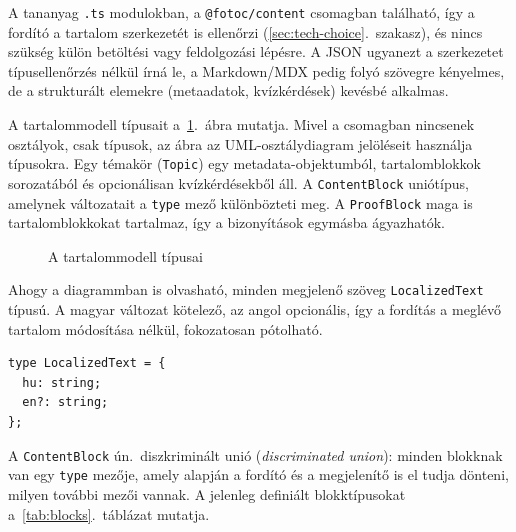 A tananyag \texttt{.ts} modulokban, a \texttt{@fotoc/content}
csomagban található, így a fordító a tartalom szerkezetét is
ellenőrzi (\ref{sec:tech-choice}.~szakasz), és nincs szükség külön
betöltési vagy feldolgozási lépésre. A JSON ugyanezt a szerkezetet
típusellenőrzés nélkül írná le, a Markdown/MDX pedig folyó szövegre
kényelmes, de a strukturált elemekre (metaadatok, kvízkérdések)
kevésbé alkalmas.

A tartalommodell típusait a~\ref{fig:content-types}.~ábra mutatja. Mivel a csomagban nincsenek
osztályok, csak típusok, az ábra az UML-osztálydiagram jelöléseit használja típusokra.
Egy témakör (\texttt{Topic}) egy metadata-objektumból, tartalomblokkok sorozatából és
opcionálisan kvízkérdésekből áll. A \texttt{ContentBlock} uniótípus, amelynek változatait a
\texttt{type} mező különbözteti meg. A \texttt{ProofBlock} maga is tartalomblokkokat tartalmaz,
így a bizonyítások egymásba ágyazhatók.

\begin{figure}[H]
    \centering
    \resizebox{\textwidth}{!}{}
    \caption{A tartalommodell típusai}
    \label{fig:content-types}
\end{figure}


Ahogy a diagrammban is olvasható, minden megjelenő szöveg \texttt{LocalizedText} típusú. A magyar
változat kötelező, az angol opcionális, így a fordítás a meglévő
tartalom módosítása nélkül, fokozatosan pótolható.

\begin{lstlisting}
type LocalizedText = {
  hu: string;
  en?: string;
};
\end{lstlisting}

A \texttt{ContentBlock} ún.\ diszkriminált unió (\emph{discriminated
union}): minden blokknak van egy \texttt{type} mezője, amely alapján a
fordító és a megjelenítő is el tudja dönteni, milyen további mezői
vannak. A jelenleg definiált blokktípusokat
a~\ref{tab:blocks}.~táblázat mutatja.

